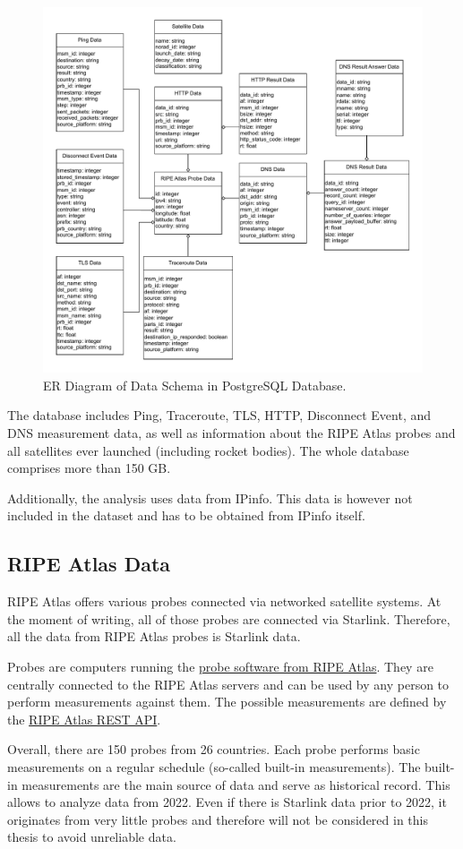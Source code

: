 \begin{figure}
	\includegraphics[width=\textwidth]{./chapters/3-methodology/img/er-diagram.drawio.pdf}
	\caption{ER Diagram of Data Schema in PostgreSQL Database.}
	\label{fig:er-diagram}
\end{figure}

The database includes Ping, Traceroute, TLS, HTTP, Disconnect Event, and DNS
measurement data, as well as information about the RIPE Atlas probes and all
satellites ever launched (including rocket bodies).
The whole database comprises more than 150 GB.

Additionally, the analysis uses data from IPinfo. This data is however not
included in the dataset and has to be obtained from IPinfo itself.

\subsection*{RIPE Atlas Data}

RIPE Atlas offers various probes connected via networked satellite systems. At
the moment of writing, all of those probes are connected via Starlink.
Therefore, all the data from RIPE Atlas probes is Starlink data.

Probes are computers running the
\href{https://github.com/RIPE-NCC/ripe-atlas-software-probe}{probe software
	from RIPE Atlas}. They are centrally connected to the RIPE Atlas
servers and
can be used by any person to perform measurements against them. The possible
measurements are defined by the
\href{https://atlas.ripe.net/docs/apis/rest-api-reference/}{RIPE Atlas REST
	API}.

Overall, there are 150 probes from 26 countries. Each probe performs basic
measurements on a regular schedule (so-called built-in measurements). The
built-in measurements are the main source of data and serve as historical
record. This allows to analyze data from 2022. Even if there is Starlink data
prior to 2022, it originates from very little probes and therefore will not be
considered in this thesis to avoid unreliable data.
